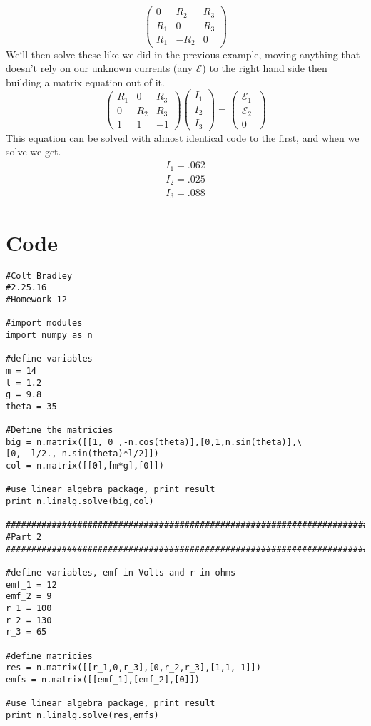 \documentclass[11pt]{article}
\begin{document}
\begin{equation}
\left( \begin{array}{ccc}
0 & R_2 & R_3 \\
R_1 & 0 & R_3 \\
R_1 & -R_2 & 0 \end{array} \right)
\label{singular}
\end{equation}
We`ll then solve these like we did in the previous example, moving anything that doesn't rely on our unknown currents (any $\mathcal{E}$) to the right hand side then building a matrix equation out of it. 
\begin{equation}
 \left( \begin{array}{ccc}
R_1 & 0 & R_3 \\
0 & R_2 & R_3 \\
1 & 1 & -1 \end{array} \right)
 \left( \begin{array}{ccc}
I_1 \\
I_2 \\
I_3 \end{array} \right) = 
 \left( \begin{array}{ccc}
\mathcal{E}_1\ \\
\mathcal{E}_2 \\
0\end{array} \right)
\end{equation}
This equation can be solved with almost identical code to the first, and when we solve we get. 
\begin{subequations}
\begin{align}
I_1 = .062 \\
I_2 = .025 \\
I_3 = .088
\end{align}
\end{subequations}
\section{Code}
\begin{verbatim}
#Colt Bradley
#2.25.16
#Homework 12

#import modules
import numpy as n

#define variables
m = 14
l = 1.2
g = 9.8
theta = 35

#Define the matricies
big = n.matrix([[1, 0 ,-n.cos(theta)],[0,1,n.sin(theta)],\
[0, -l/2., n.sin(theta)*l/2]])
col = n.matrix([[0],[m*g],[0]])

#use linear algebra package, print result
print n.linalg.solve(big,col)

############################################################################
#Part 2
############################################################################

#define variables, emf in Volts and r in ohms
emf_1 = 12
emf_2 = 9
r_1 = 100
r_2 = 130
r_3 = 65

#define matricies
res = n.matrix([[r_1,0,r_3],[0,r_2,r_3],[1,1,-1]])
emfs = n.matrix([[emf_1],[emf_2],[0]])

#use linear algebra package, print result
print n.linalg.solve(res,emfs)
\end{verbatim}
\end{document}
